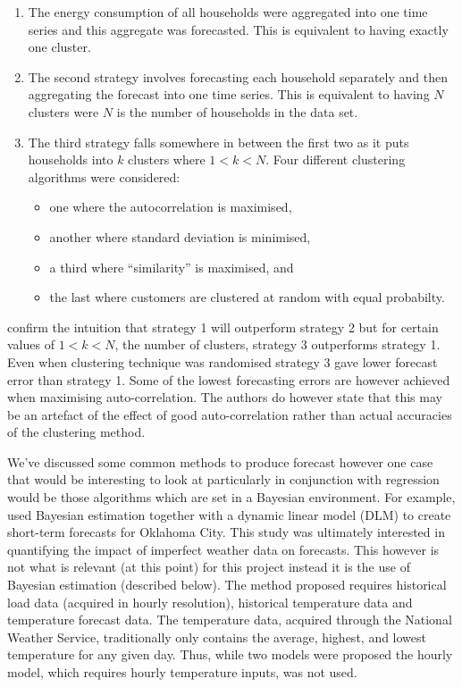 \documentclass[a4paper]{article}
\begin{document}
\begin{enumerate}
\item \label{strat1} The energy consumption of all households were aggregated into one time series and this aggregate was forecasted. This is equivalent to having exactly one cluster.
\item \label{strat2} The second strategy involves forecasting each household separately and then aggregating the forecast into one time series. This is equivalent to having $N$ clusters were $N$ is the number of households in the data set.
\item \label{strat3} The third strategy falls somewhere in between the first two as it puts households into $k$ clusters where $1 < k < N$. Four different clustering algorithms  were considered: \begin{itemize} \item one where the autocorrelation is maximised, \item another where standard deviation is minimised, \item a third where ``similarity'' is maximised, and \item the last where customers are clustered at random with equal probabilty. \end{itemize}
\end{enumerate}
\citet{cbaf} confirm the intuition that strategy 1 will outperform strategy 2 but for certain values of $1<k<N$, the number of clusters, strategy 3 outperforms strategy 1. Even when clustering technique was randomised strategy 3 gave lower forecast error than strategy 1. Some of the lowest forecasting errors are however achieved when maximising auto-correlation. The authors do however state that this may be an artefact of the effect of good auto-correlation rather than actual accuracies of the clustering method.

We've discussed some common methods to produce forecast however one case that would be interesting to look at particularly in conjunction with regression would be those algorithms which are set in a Bayesian environment. For example,  \cite{douglas98} used Bayesian estimation together with a dynamic linear model (DLM) to create short-term forecasts for Oklahoma City. This study was ultimately interested in quantifying the impact of imperfect weather data on forecasts. This however is not what is relevant (at this point) for this project instead it is the use of Bayesian estimation (described below). The method proposed requires historical load data (acquired in hourly resolution), historical temperature data and temperature forecast data. The temperature data, acquired through the National Weather Service, traditionally only contains the average, highest, and lowest temperature for any given day. Thus, while two models were proposed the hourly model, which requires hourly temperature inputs, was not used.
\end{document}

